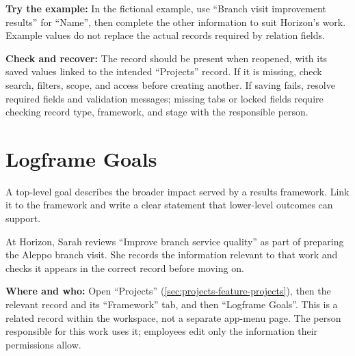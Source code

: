 \textbf{Try the example:} In the fictional example, use “Branch visit improvement results” for “Name”, then complete the other information to suit Horizon's work. Example values do not replace the actual records required by relation fields.

\textbf{Check and recover:} The record should be present when reopened, with its saved values linked to the intended “Projects” record. If it is missing, check search, filters, scope, and access before creating another. If saving fails, resolve required fields and validation messages; missing tabs or locked fields require checking record type, framework, and stage with the responsible person.

\clearpage
\section{Logframe Goals}
\label{sec:projects-feature-logframe-goals}

A top-level goal describes the broader impact served by a results framework. Link it to the framework and write a clear statement that lower-level outcomes can support.

\begin{rcnote}
At Horizon, Sarah reviews “Improve branch service quality” as part of preparing the Aleppo branch visit. She records the information relevant to that work and checks it appears in the correct record before moving on.
\end{rcnote}

\textbf{Where and who:} Open “Projects” (\ref{sec:projects-feature-projects}), then the relevant record and its “Framework” tab, and then “Logframe Goals”. This is a related record within the workspace, not a separate app-menu page. The person responsible for this work uses it; employees edit only the information their permissions allow.

